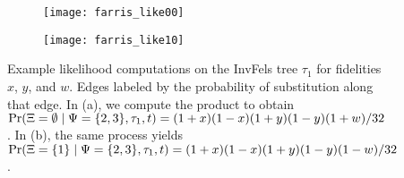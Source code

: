 \begin{figure}
\centering
\begin{subfigure}{.45\linewidth}
\centering
\texttt{[image: farris\_like00]}
\caption[short]{}
\end{subfigure}
\begin{subfigure}{.45\linewidth}
\centering
\texttt{[image: farris\_like10]}
\caption[short]{}
\end{subfigure}
\caption{
    Example likelihood computations on the InvFels tree $\tau_1$ for fidelities $x$, $y$, and $w$.
    Edges labeled by the probability of substitution along that edge.
    In (a), we compute the product to obtain $\Pr(\Xi=\emptyset\mid \Psi=\{2,3\},\tau_1,t) = (1+x)(1-x)(1+y)(1-y)(1+w)/32$.
    In (b), the same process yields $\Pr(\Xi=\{1\}\mid \Psi=\{2,3\},\tau_1,t) = (1+x)(1-x)(1+y)(1-y)(1-w)/32$.
}
\label{fig:example_likelihoods}
\end{figure}

